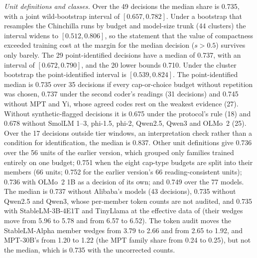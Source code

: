 \textit{Unit definitions and classes.} Over the 49 decisions the median share is 0.735, with a joint wild-bootstrap
interval of $[0.657,0.782]$. Under a bootstrap that resamples the Chinchilla runs by budget and model-size trunk (44
clusters) the interval widens to $[0.512,0.806]$, so the statement that the value of compactness exceeded training cost
at the margin for the median decision ($s>0.5$) survives only barely. The 29 point-identified decisions have a median of
0.737, with an interval of $[0.672,0.790]$, and the 20 lower bounds 0.710. Under the cluster bootstrap the
point-identified interval is $[0.539,0.824]$. The point-identified median is 0.735 over 35 decisions if every
cap-or-choice budget without repetition was chosen, 0.737 under the second coder's readings (31 decisions) and 0.745
without MPT and Yi, whose agreed codes rest on the weakest evidence (27). Without synthetic-flagged decisions it is
0.675 under the protocol's rule (18) and 0.678 without SmolLM 1--3, phi-1.5, phi-2, Qwen2.5, Qwen3 and OLMo~2 (25). Over
the 17 decisions outside tier windows, an interpretation check rather than a condition for identification, the median is
0.837. Other unit definitions give 0.736 over the 56 units of the earlier version, which grouped only families trained
entirely on one budget; 0.751 when the eight cap-type budgets are split into their members (66 units; 0.752 for the
earlier version's 66 reading-consistent units); 0.736 with OLMo~2 1B as a decision of its own; and 0.749 over the 77
models. The median is 0.737 without Alibaba's models (43 decisions), 0.735 without Qwen2.5 and Qwen3, whose per-member
token counts are not audited, and 0.735 with StableLM-3B-4E1T and TinyLlama at the effective data of
\citet{muennighoff2023scaling} (their wedges move from 5.96 to 5.78 and from 6.57 to 6.52). The token audit moves the
StableLM-Alpha member wedges from 3.79 to 2.66 and from 2.65 to 1.92, and MPT-30B's from 1.20 to 1.22 (the MPT family
share from 0.24 to 0.25), but not the median, which is 0.735 with the uncorrected counts.

